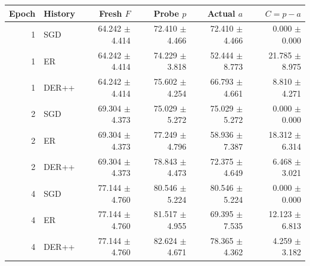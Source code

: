 \begin{tabular}{rlrrrr}
\toprule
Epoch & History & Fresh $F$ & Probe $p$ & Actual $a$ & $C=p-a$ \\
\midrule
1 & SGD & 64.242 $\pm$ 4.414 & 72.410 $\pm$ 4.466 & 72.410 $\pm$ 4.466 & 0.000 $\pm$ 0.000 \\
1 & ER & 64.242 $\pm$ 4.414 & 74.229 $\pm$ 3.818 & 52.444 $\pm$ 8.773 & 21.785 $\pm$ 8.975 \\
1 & DER++ & 64.242 $\pm$ 4.414 & 75.602 $\pm$ 4.254 & 66.793 $\pm$ 4.661 & 8.810 $\pm$ 4.271 \\
2 & SGD & 69.304 $\pm$ 4.373 & 75.029 $\pm$ 5.272 & 75.029 $\pm$ 5.272 & 0.000 $\pm$ 0.000 \\
2 & ER & 69.304 $\pm$ 4.373 & 77.249 $\pm$ 4.796 & 58.936 $\pm$ 7.387 & 18.312 $\pm$ 6.314 \\
2 & DER++ & 69.304 $\pm$ 4.373 & 78.843 $\pm$ 4.473 & 72.375 $\pm$ 4.649 & 6.468 $\pm$ 3.021 \\
4 & SGD & 77.144 $\pm$ 4.760 & 80.546 $\pm$ 5.224 & 80.546 $\pm$ 5.224 & 0.000 $\pm$ 0.000 \\
4 & ER & 77.144 $\pm$ 4.760 & 81.517 $\pm$ 4.955 & 69.395 $\pm$ 7.535 & 12.123 $\pm$ 6.813 \\
4 & DER++ & 77.144 $\pm$ 4.760 & 82.624 $\pm$ 4.671 & 78.365 $\pm$ 4.362 & 4.259 $\pm$ 3.182 \\
\bottomrule
\end{tabular}
